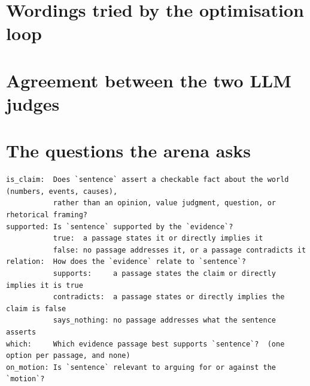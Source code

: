 \documentclass[11pt,a4paper]{article}
\begin{document}



\appendix
\section{Wordings tried by the optimisation loop}
\begin{table}[h]
\centering\footnotesize
{}
\caption{Every \emph{contradicts} description the loop evaluated on the 400-pair training sample, with its AUROC and its detection and false-alarm rates at 0.7. Round 0 is the seed.}
\end{table}

\section{Agreement between the two LLM judges}


\section{The questions the arena asks}
\footnotesize
\begin{verbatim}
is_claim:  Does `sentence` assert a checkable fact about the world (numbers, events, causes),
           rather than an opinion, value judgment, question, or rhetorical framing?
supported: Is `sentence` supported by the `evidence`?
           true:  a passage states it or directly implies it
           false: no passage addresses it, or a passage contradicts it
relation:  How does the `evidence` relate to `sentence`?
           supports:     a passage states the claim or directly implies it is true
           contradicts:  a passage states or directly implies the claim is false
           says_nothing: no passage addresses what the sentence asserts
which:     Which evidence passage best supports `sentence`?  (one option per passage, and none)
on_motion: Is `sentence` relevant to arguing for or against the `motion`?
\end{verbatim}
\end{document}
